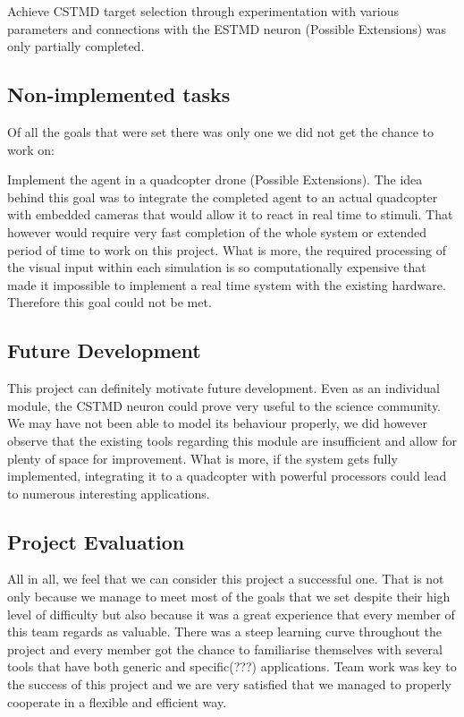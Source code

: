 \documentclass[a4paper,11pt]{article}
\begin{document}
\noindent

Achieve CSTMD target selection through experimentation with various parameters and connections 
with the ESTMD neuron (Possible Extensions)
was only partially completed.

\subsection{Non-implemented tasks}

Of all the goals that were set there was only one we did not get the chance to work on:

\noindent
Implement the agent in a quadcopter drone (Possible Extensions).
The idea behind this goal was to integrate the completed agent to an actual quadcopter with 
embedded cameras that would allow it to react in real time to stimuli. That however would require
very fast completion of the whole system or extended period of time to work on this project. What is 
more, the required processing of the visual input within each simulation is so computationally 
expensive that made it impossible to implement a real time system with the existing hardware. 
Therefore this goal could not be met.

\subsection{Future Development}

This project can definitely motivate future development.  Even as an individual module, the CSTMD 
neuron could prove very useful to the science community. We may have not been able to model its 
behaviour properly, we did however observe that the existing tools regarding this module are 
insufficient and allow for plenty of space for improvement. What is more, if the system gets fully 
implemented, integrating it to a quadcopter with powerful processors could lead to numerous 
interesting applications.

\subsection{Project Evaluation}

All in all, we feel that we can consider this project a successful one. That is not only because we 
manage to meet most of the goals that we set despite their high level of difficulty but also because it 
was a great experience that every member of this team regards as valuable. There was a steep 
learning curve throughout the project and every member got the chance to familiarise themselves 
with several tools that have both generic and specific(???) applications. Team work was key to the 
success of this project and we are very satisfied that we managed to properly cooperate in a flexible 
and efficient way.
\end{document}
